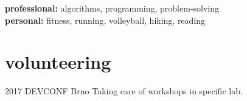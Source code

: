 \documentclass[]{friggeri-cv} %
\begin{document}
\textbf{professional:} algorithms, programming, problem-solving \\\textbf{personal:} fitness, running, volleyball, hiking, reading


\section{volunteering}

\begin{entrylist}

\entry
{2017}
{DEVCONF}
{Brno}
{Taking care of workshops in specific lab.}
\end{entrylist}

\end{document}
